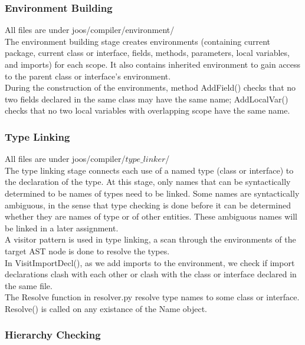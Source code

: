 \documentclass[12pt, a4paper]{article}
\begin{document}
\subsubsection{Environment Building}

All files are under joos/compiler/environment/ \\

The environment building stage creates environments (containing current package, current class or interface, fields, methods, parameters, local variables, and imports) for each scope. It also contains inherited environment to gain access to the parent class or interface's environment.\\

During the construction of the environments, method AddField() checks that no two fields declared in the same class may have the same name; AddLocalVar() checks that no two local variables with overlapping scope have the same name.

\subsubsection{Type Linking}

All files are under joos/compiler/$type\_linker$/ \\

The type linking stage connects each use of a named type (class or interface) to the declaration of the type. At this stage, only names that can be syntactically determined to be names of types need to be linked. Some names are syntactically ambiguous, in the sense that type checking is done before it can be determined whether they are names of type or of other entities. These ambiguous names will be linked in a later assignment. \\

A visitor pattern is used in type linking, a scan through the environments of the target AST node is done to resolve the types. \\

In VisitImportDecl(), as we add imports to the environment, we check if import declarations clash with each other or clash with the class or interface declared in the same file. \\

The Resolve function in resolver.py resolve type names to some class or interface. Resolve() is called on any existance of the Name object.\\

\subsubsection{Hierarchy Checking}
\end{document}
